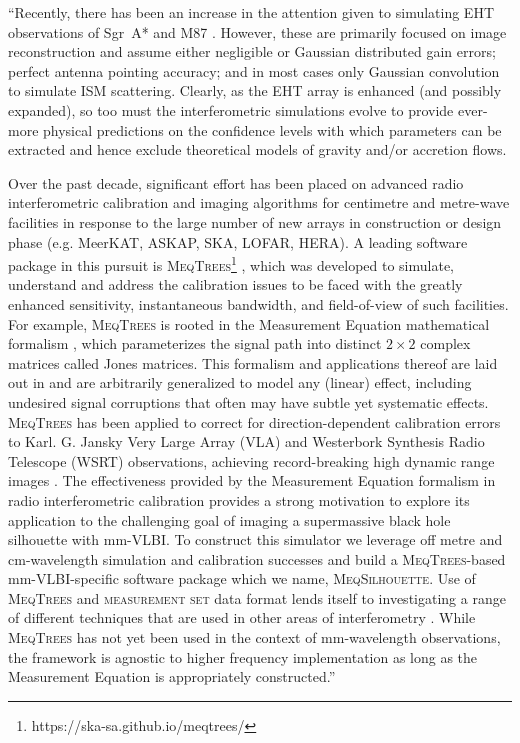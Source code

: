 ``Recently, there has been an increase in the attention given to simulating EHT observations of Sgr~A*  and M87 \citep{Fish_2014,Lu_2014,Bouman_2015,Lu_2016,Chael_2016}. However, these are primarily focused on image reconstruction and assume either negligible or Gaussian distributed gain errors; perfect antenna pointing accuracy; and in most cases only Gaussian convolution to simulate ISM scattering. Clearly, as the EHT array is enhanced (and possibly expanded), so too must the interferometric simulations evolve to provide ever-more physical predictions on the confidence levels with which parameters can be extracted and hence exclude theoretical models of gravity and/or accretion flows.


Over the past decade, significant effort has been placed on advanced radio interferometric calibration and imaging algorithms for centimetre and metre-wave facilities in response to the large number of new arrays in construction or design phase (e.g. MeerKAT, ASKAP, SKA, LOFAR, HERA). A leading software package in this pursuit is \textsc{MeqTrees}\footnote{https://ska-sa.github.io/meqtrees/} \citep*{Noordam_2010}, which was developed to simulate, understand and address the calibration issues to be faced with the greatly enhanced sensitivity, instantaneous bandwidth, and field-of-view of such facilities. For example, \textsc{MeqTrees} is rooted in the Measurement Equation mathematical formalism \citep{Hamaker_1996}, which parameterizes the signal path into distinct $2 \times 2$ complex  matrices called Jones matrices. This formalism and applications thereof are laid out in \citep{Smirnov_2011a,Smirnov_2011b,Smirnov_2011c} and are arbitrarily generalized to model any (linear) effect, including undesired signal corruptions that often may have subtle yet systematic effects. \textsc{MeqTrees} has been applied to correct for direction-dependent calibration errors to Karl. G. Jansky Very Large Array (VLA) and Westerbork Synthesis Radio Telescope (WSRT) observations, achieving record-breaking high dynamic range images \citep[][Makhathini et al, in prep.]{Smirnov_2011c}. The effectiveness provided by the Measurement Equation formalism in radio interferometric calibration provides a strong motivation to explore its application to the challenging goal of imaging a supermassive black hole silhouette with mm-VLBI. To construct this simulator we leverage off metre and cm-wavelength simulation and calibration successes and build a \textsc{MeqTrees}-based mm-VLBI-specific software package which we name, \textsc{MeqSilhouette}.  Use of \textsc{MeqTrees} and \textsc{measurement set} data format lends itself to investigating a range of different techniques that are used in other areas of interferometry \citep*[e.g.][]{Smirnov_2015}. While \textsc{MeqTrees} has not yet been used in the context of mm-wavelength observations, the framework is agnostic to higher frequency implementation as long as the Measurement Equation is appropriately constructed.'' \citep{Blecher_2016}


